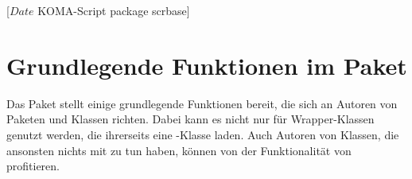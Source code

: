 %
%
%
%
%
%
%
%
% 
%
%
%
%

                 [$Date$
                  KOMA-Script package scrbase]

\chapter{Grundlegende Funktionen im Paket }
\BeginIndexGroup
{}%

Das Paket  stellt einige grundlegende Funktionen bereit, die
sich an Autoren von Paketen und Klassen richten. Dabei kann es nicht nur für
Wrapper-Klassen genutzt werden, die ihrerseits eine \KOMAScript-Klasse
laden. Auch Autoren von Klassen, die ansonsten nichts mit \KOMAScript{} zu tun
haben, können von der Funktionalität von  profitieren.

